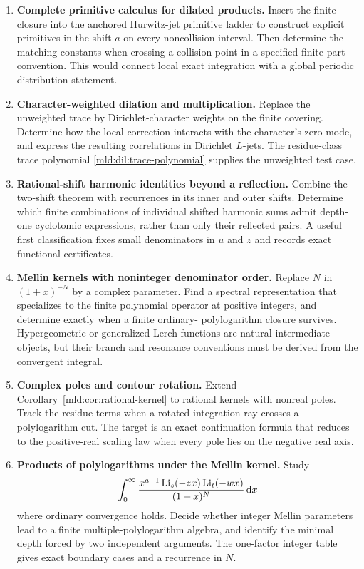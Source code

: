 \begin{enumerate}[label=\textbf{Q\arabic*.},leftmargin=2.7em]
\item \textbf{Complete primitive calculus for dilated products.}
Insert the finite closure into the anchored Hurwitz-jet primitive
ladder to construct explicit primitives in the shift $a$ on every
noncollision interval. Then determine the matching constants when
crossing a collision point in a specified finite-part convention.
This would connect local exact integration with a global periodic
distribution statement.

\item \textbf{Character-weighted dilation and multiplication.}
Replace the unweighted trace by Dirichlet-character weights on the
finite covering. Determine how the local correction interacts with
the character's zero mode, and express the resulting correlations in
Dirichlet $L$-jets. The residue-class trace polynomial
\eqref{mld:dil:trace-polynomial} supplies the unweighted test case.

\item \textbf{Rational-shift harmonic identities beyond a reflection.}
Combine the two-shift theorem with recurrences in its inner and outer
shifts. Determine which finite combinations of individual shifted
harmonic sums admit depth-one cyclotomic expressions, rather than only
their reflected pairs. A useful first classification fixes small
denominators in $u$ and $z$ and records exact functional certificates.

\item \textbf{Mellin kernels with noninteger denominator order.}
Replace $N$ in $(1+x)^{-N}$ by a complex parameter. Find a spectral
representation that specializes to the finite polynomial operator at
positive integers, and determine exactly when a finite ordinary-
polylogarithm closure survives. Hypergeometric or generalized Lerch
functions are natural intermediate objects, but their branch and
resonance conventions must be derived from the convergent integral.

\item \textbf{Complex poles and contour rotation.}
Extend Corollary~\ref{mld:cor:rational-kernel} to rational kernels with
nonreal poles. Track the residue terms when a rotated integration ray
crosses a polylogarithm cut. The target is an exact continuation formula
that reduces to the positive-real scaling law when every pole lies on
the negative real axis.

\item \textbf{Products of polylogarithms under the Mellin kernel.}
Study
\[
 \int_0^\infty \frac{x^{a-1}\operatorname{Li}_s(-zx)\operatorname{Li}_t(-wx)}{(1+x)^N}\,\mathrm{d} x
\]
where ordinary convergence holds. Decide whether integer Mellin
parameters lead to a finite multiple-polylogarithm algebra, and identify
the minimal depth forced by two independent arguments. The one-factor
integer table gives exact boundary cases and a recurrence in $N$.


\end{enumerate}
